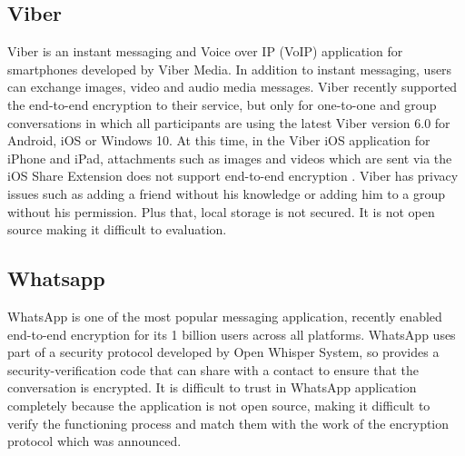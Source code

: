 \subsection{Viber}
Viber is an instant messaging and Voice over IP (VoIP) application for smartphones developed by Viber Media. In addition to instant messaging, users can exchange images,
video and audio media messages. Viber recently supported the end-to-end encryption to their service, but only for one-to-one and group conversations in which all
participants are using the latest Viber version 6.0 for Android, iOS or Windows 10. At this time, in the Viber iOS application for iPhone and iPad, attachments such as images and videos which are sent via the iOS Share Extension does not support end-to-end encryption .\cite{shyam} Viber has privacy issues such as adding a friend without his knowledge or adding him to a group without his permission. Plus that, local storage is not secured. It is not
open source making it difficult to evaluation.

\subsection{Whatsapp}
WhatsApp is one of the most popular messaging application, recently enabled end-to-end encryption for its 1 billion users across all platforms. WhatsApp uses part of a security protocol developed by Open Whisper System, so provides a security-verification code that can share with a contact to ensure that the conversation is encrypted. It is difficult to trust in WhatsApp application completely because the application is not open source, making it difficult to verify the functioning process and match them with the work of the encryption protocol which was announced.

